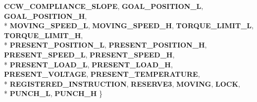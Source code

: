 \begin{DoxyCompactItemize}
{\bfseries C\+C\+W\+\_\+\+C\+O\+M\+P\+L\+I\+A\+N\+C\+E\+\_\+\+S\+L\+O\+PE}, 
{\bfseries G\+O\+A\+L\+\_\+\+P\+O\+S\+I\+T\+I\+O\+N\+\_\+L}, 
{\bfseries G\+O\+A\+L\+\_\+\+P\+O\+S\+I\+T\+I\+O\+N\+\_\+H}, 
\\*
{\bfseries M\+O\+V\+I\+N\+G\+\_\+\+S\+P\+E\+E\+D\+\_\+L}, 
{\bfseries M\+O\+V\+I\+N\+G\+\_\+\+S\+P\+E\+E\+D\+\_\+H}, 
{\bfseries T\+O\+R\+Q\+U\+E\+\_\+\+L\+I\+M\+I\+T\+\_\+L}, 
{\bfseries T\+O\+R\+Q\+U\+E\+\_\+\+L\+I\+M\+I\+T\+\_\+H}, 
\\*
{\bfseries P\+R\+E\+S\+E\+N\+T\+\_\+\+P\+O\+S\+I\+T\+I\+O\+N\+\_\+L}, 
{\bfseries P\+R\+E\+S\+E\+N\+T\+\_\+\+P\+O\+S\+I\+T\+I\+O\+N\+\_\+H}, 
{\bfseries P\+R\+E\+S\+E\+N\+T\+\_\+\+S\+P\+E\+E\+D\+\_\+L}, 
{\bfseries P\+R\+E\+S\+E\+N\+T\+\_\+\+S\+P\+E\+E\+D\+\_\+H}, 
\\*
{\bfseries P\+R\+E\+S\+E\+N\+T\+\_\+\+L\+O\+A\+D\+\_\+L}, 
{\bfseries P\+R\+E\+S\+E\+N\+T\+\_\+\+L\+O\+A\+D\+\_\+H}, 
{\bfseries P\+R\+E\+S\+E\+N\+T\+\_\+\+V\+O\+L\+T\+A\+GE}, 
{\bfseries P\+R\+E\+S\+E\+N\+T\+\_\+\+T\+E\+M\+P\+E\+R\+A\+T\+U\+RE}, 
\\*
{\bfseries R\+E\+G\+I\+S\+T\+E\+R\+E\+D\+\_\+\+I\+N\+S\+T\+R\+U\+C\+T\+I\+ON}, 
{\bfseries R\+E\+S\+E\+R\+V\+E3}, 
{\bfseries M\+O\+V\+I\+NG}, 
{\bfseries L\+O\+CK}, 
\\*
{\bfseries P\+U\+N\+C\+H\+\_\+L}, 
{\bfseries P\+U\+N\+C\+H\+\_\+H}
 \}\hypertarget{group__SREGISTER__GROUP_gac1098cbfe1e1cb0d6784f266599924df}{}\label{group__SREGISTER__GROUP_gac1098cbfe1e1cb0d6784f266599924df}


\end{DoxyCompactItemize}
